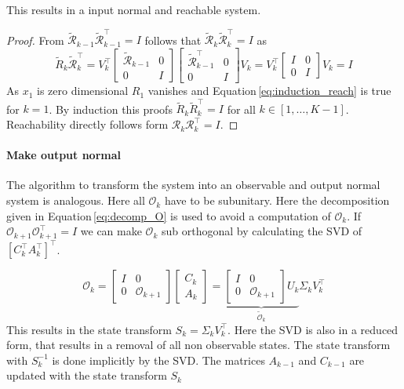 \documentclass[doctype=mastersthesis,BCOR=15mm,biblatex]{ldvbook}%
\newcommand{\R}{\mathcal{R}} %
\newcommand{\Ob}{\mathcal{O}} %
\newcommand{\eye}{I} %
\begin{document}
\begin{itemize}
This results in a input normal and reachable system.
\begin{proof}
	From $\tilde{\R}_{k-1}\tilde{\R}_{k-1}^\top = \eye$ follows that $\tilde{\R}_k\tilde{\R}_k^\top = \eye$ as
	\begin{equation}\label{eq:induction_reach}
	\tilde{R}_k\tilde{\R}_k^\top
	=
	V_k^\top\begin{bmatrix}\tilde{\R}_{k-1} &0\\
		0& \eye \end{bmatrix}
	\begin{bmatrix}\tilde{\R}_{k-1}^\top &0\\
		0& \eye \end{bmatrix} V_k
	= 
	V_k^\top\begin{bmatrix}\eye &0\\
	0& \eye \end{bmatrix} V_k
	=
	\eye
	\end{equation}
	As $x_1$ is zero dimensional $R_1$ vanishes and Equation\,\ref{eq:induction_reach} is true for $k=1$.
	By induction this proofs $\tilde{R}_k\tilde{R}_k^\top = \eye$ for all $k \in [1,\dots,K-1]$.
	Reachability directly follows form $\R_k\R_k^\top = \eye$.
\end{proof}




\paragraph{Make output normal}
The algorithm to transform the system into an observable and output normal system is analogous.
Here all $\Ob_k$ have to be subunitary.
Here the decomposition given in Equation\,\ref{eq:decomp_O} is used to avoid a computation of $\Ob_k$.
If $\Ob_{k+1} \Ob_{k+1}^\top=\eye$ we can make $\Ob_{k}$ sub orthogonal by calculating the SVD of $[C_k^\top A_k^\top]^\top$.

\begin{equation}
	\Ob_{k}
	=
	\begin{bmatrix}
	\eye& 0 \\
	0& \Ob_{k+1}
	\end{bmatrix}
	\begin{bmatrix}
	C_k\\
	A_k
	\end{bmatrix}
	=
	\underbrace{
	\begin{bmatrix}
	\eye& 0 \\
	0& \Ob_{k+1}
	\end{bmatrix}
	U_k}_{\tilde{\Ob}_k}
	\Sigma_k V_k^\top
\end{equation}
This results in the state transform $S_k = \Sigma_k V_k^\top$.
Here the SVD is also in a reduced form, that results in a removal of all non observable states.
The state transform with $S_k^{-1}$ is done implicitly by the SVD.
The matrices $A_{k-1}$ and $C_{k-1}$ are updated with the state transform $S_k$


\end{itemize}
\end{document}
